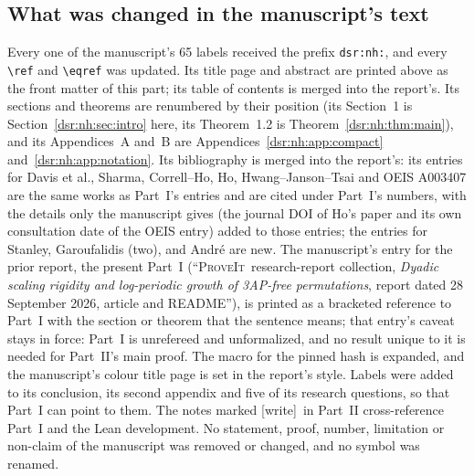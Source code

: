 \documentclass[11pt,a4paper]{article}
\numberwithin{equation}{section}
\theoremstyle{definition}
\theoremstyle{remark}
\newcommand{\repo}{\textsc{ProveIt}}
\newcommand{\wtag}{\textup{[write]}}
\newcommand{\lean}[1]{\nolinkurl{#1}}
\theoremstyle{definition}
\theoremstyle{plain}
\begin{document}
\subsection{What was changed in the manuscript's text}
\label{dsr:nh:sec:changes}
Every one of the manuscript's 65 labels received the prefix
\lean{dsr:nh:}, and every \texttt{\textbackslash ref} and \texttt{\textbackslash eqref} was updated.
Its title page and abstract are printed above as the front matter of this
part; its table of contents is merged into the report's. Its sections and
theorems are renumbered by their position (its Section~1 is
Section~\ref{dsr:nh:sec:intro} here, its Theorem~1.2 is
Theorem~\ref{dsr:nh:thm:main}), and its Appendices~A and~B are
Appendices~\ref{dsr:nh:app:compact} and~\ref{dsr:nh:app:notation}. Its
bibliography is merged into the report's: its entries for Davis et al.,
Sharma, Correll--Ho, Ho, Hwang--Janson--Tsai and OEIS A003407 are the
same works as Part~I's entries and are cited under Part~I's numbers, with
the details only the manuscript gives (the journal DOI of Ho's paper and
its own consultation date of the OEIS entry) added to those entries; the
entries for Stanley, Garoufalidis (two), and Andr\'e are new. The
manuscript's entry for the prior report, the present Part~I (``\repo\
research-report collection, \emph{Dyadic scaling rigidity and log-periodic
growth of 3AP-free permutations}, report dated 28 September 2026, article
and README''), is printed as a bracketed reference to Part~I with the
section or theorem that the sentence means; that entry's caveat stays in
force: Part~I is unrefereed and unformalized, and no result unique to it is
needed for Part~II's main proof. The macro for the pinned hash is expanded,
and the manuscript's colour title page is set in the report's style.
Labels were added to its conclusion, its second appendix and five of its
research questions, so that Part~I can point to them. The notes marked
\wtag\ in Part~II cross-reference Part~I and the Lean development. No
statement, proof, number, limitation or non-claim of the manuscript was
removed or changed, and no symbol was renamed.
\end{document}
